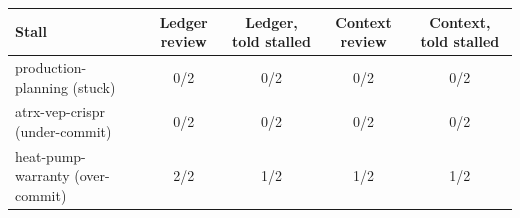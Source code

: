 \begin{tabular}{@{}lcccc@{}}
\toprule
Stall & Ledger review & Ledger, told stalled & Context review & Context, told stalled \\
\midrule
production-planning (stuck) & 0/2 & 0/2 & 0/2 & 0/2 \\
atrx-vep-crispr (under-commit) & 0/2 & 0/2 & 0/2 & 0/2 \\
heat-pump-warranty (over-commit) & 2/2 & 1/2 & 1/2 & 1/2 \\
\bottomrule
\end{tabular}
